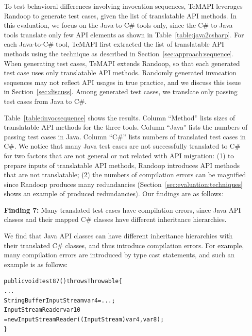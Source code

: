 To test behavioral differences involving invocation sequences, TeMAPI leverages Randoop to generate test cases, given the list of translatable API methods. In this evaluation, we focus on the Java-to-C\# tools only, since the C\#-to-Java tools translate only few API elements as shown in Table~\ref{table:java2csharp}. For each Java-to-C\# tool, TeMAPI first extracted the list of translatable API methods using the technique as described in Section~\ref{sec:approach:sequence}. When generating test cases, TeMAPI extends Randoop, so that each generated test case uses only translatable API methods. Randomly generated invocation sequences may not reflect API usages in true practice, and we discuss this issue in Section~\ref{sec:discuss}. Among generated test cases, we translate only passing test cases from Java to C\#.

Table~\ref{table:invocsequence} shows the results. Column ``Method'' lists sizes of translatable API methods for the three tools. Column ``Java'' lists the numbers of passing test cases in Java. Column ``C\#'' lists numbers of translated test cases in C\#. We notice that many Java test cases are not successfully translated to C\# for two factors that are not general or not related with API migration: (1) to prepare inputs of translatable API methods, Randoop introduces API methods that are not translatable; (2) the numbers of compilation errors can be magnified since Randoop produces many redundancies (Section~\ref{sec:evaluation:techniques} shows an example of produced redundancies). Our findings are as follows:

\textbf{Finding 7:} Many translated test cases have compilation errors, since Java API classes and their mapped C\# classes have different inheritance hierarchies.

We find that Java API classes can have different inheritance hierarchies with their translated C\# classes, and thus introduce compilation errors. For example, many compilation errors are introduced by type cast statements, and such an example is as follows:

\begin{CodeOut}%
\begin{alltt}
public void test87() throws Throwable\{
  ...
  StringBufferInputStream var4 = ...;
  InputStreamReader var10
    = new InputStreamReader((InputStream)var4, var8);
\}
\end{alltt}
\end{CodeOut}%

